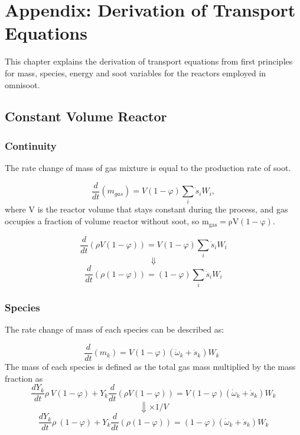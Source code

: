 \chapter{Appendix: Derivation of Transport Equations}
This chapter explains the derivation of transport equations from first principles for mass, species, energy and soot variables for the reactors employed in omnisoot.
\section{Constant Volume Reactor}
\label{sec:derivconstuv}

\subsection{Continuity}
The rate change of mass of gas mixture is equal to the production rate of soot.

\begin{equation*}
	\frac{d}{dt}\left(m_{gas}\right)=V\left(1-\varphi\right)\sum_{i}{{\dot{s}}_iW_i},
\end{equation*}
where V is the reactor volume that stays constant during the process, and gas occupies a fraction of volume reactor without soot, so $\mathrm{m_{gas}= \rho V (1-\varphi)}$.

\begin{equation*}
	\frac{d}{dt}\left(\rho V(1-\varphi)\right)=V\left(1-\varphi\right)\sum_{i}{{\dot{s}}_iW_i}
\end{equation*}
\begin{equation*}
	\Downarrow
\end{equation*}
\begin{equation}
	\frac{d}{dt}\left(\rho (1-\varphi)\right)=\left(1-\varphi\right)\sum_{i}{{\dot{s}}_iW_i}
\end{equation}

\subsection{Species}

The rate change of mass of each species can be described as:

\begin{equation*}
	\frac{d}{dt}\left(m_k\right)=V\left(1-\varphi\right)\left({\dot{\omega}}_k+{\dot{s}}_k\right)W_k\ \ 
\end{equation*}
The mass of each species is defined as the total gas mass multiplied by the mass fraction as
\begin{equation*}
	\frac{dY_k}{dt}\rho\ V(1-\varphi)+Y_k\frac{d}{dt}\left(\rho V(1-\varphi)\right)=V\left(1-\varphi\right)\left({\dot{\omega}}_k+{\dot{s}}_k\right)W_k
\end{equation*}
\begin{equation*}
	\Downarrow \times 1/V
\end{equation*}
\begin{equation*}
	\frac{dY_k}{dt}\rho\ (1-\varphi)+Y_k\frac{d}{dt}\left(\rho (1-\varphi)\right)=\left(1-\varphi\right)\left({\dot{\omega}}_k+{\dot{s}}_k\right)W_k
\end{equation*}